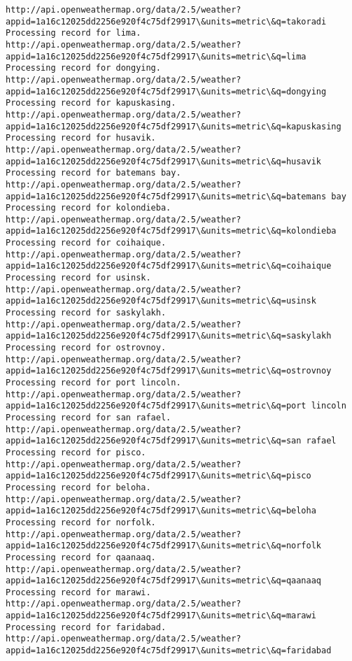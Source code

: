 \documentclass[11pt]{article}
\begin{document}
\begin{Verbatim}[commandchars=\\\{\}]
http://api.openweathermap.org/data/2.5/weather?appid=1a16c12025dd2256e920f4c75df29917\&units=metric\&q=takoradi
Processing record for lima.
http://api.openweathermap.org/data/2.5/weather?appid=1a16c12025dd2256e920f4c75df29917\&units=metric\&q=lima
Processing record for dongying.
http://api.openweathermap.org/data/2.5/weather?appid=1a16c12025dd2256e920f4c75df29917\&units=metric\&q=dongying
Processing record for kapuskasing.
http://api.openweathermap.org/data/2.5/weather?appid=1a16c12025dd2256e920f4c75df29917\&units=metric\&q=kapuskasing
Processing record for husavik.
http://api.openweathermap.org/data/2.5/weather?appid=1a16c12025dd2256e920f4c75df29917\&units=metric\&q=husavik
Processing record for batemans bay.
http://api.openweathermap.org/data/2.5/weather?appid=1a16c12025dd2256e920f4c75df29917\&units=metric\&q=batemans bay
Processing record for kolondieba.
http://api.openweathermap.org/data/2.5/weather?appid=1a16c12025dd2256e920f4c75df29917\&units=metric\&q=kolondieba
Processing record for coihaique.
http://api.openweathermap.org/data/2.5/weather?appid=1a16c12025dd2256e920f4c75df29917\&units=metric\&q=coihaique
Processing record for usinsk.
http://api.openweathermap.org/data/2.5/weather?appid=1a16c12025dd2256e920f4c75df29917\&units=metric\&q=usinsk
Processing record for saskylakh.
http://api.openweathermap.org/data/2.5/weather?appid=1a16c12025dd2256e920f4c75df29917\&units=metric\&q=saskylakh
Processing record for ostrovnoy.
http://api.openweathermap.org/data/2.5/weather?appid=1a16c12025dd2256e920f4c75df29917\&units=metric\&q=ostrovnoy
Processing record for port lincoln.
http://api.openweathermap.org/data/2.5/weather?appid=1a16c12025dd2256e920f4c75df29917\&units=metric\&q=port lincoln
Processing record for san rafael.
http://api.openweathermap.org/data/2.5/weather?appid=1a16c12025dd2256e920f4c75df29917\&units=metric\&q=san rafael
Processing record for pisco.
http://api.openweathermap.org/data/2.5/weather?appid=1a16c12025dd2256e920f4c75df29917\&units=metric\&q=pisco
Processing record for beloha.
http://api.openweathermap.org/data/2.5/weather?appid=1a16c12025dd2256e920f4c75df29917\&units=metric\&q=beloha
Processing record for norfolk.
http://api.openweathermap.org/data/2.5/weather?appid=1a16c12025dd2256e920f4c75df29917\&units=metric\&q=norfolk
Processing record for qaanaaq.
http://api.openweathermap.org/data/2.5/weather?appid=1a16c12025dd2256e920f4c75df29917\&units=metric\&q=qaanaaq
Processing record for marawi.
http://api.openweathermap.org/data/2.5/weather?appid=1a16c12025dd2256e920f4c75df29917\&units=metric\&q=marawi
Processing record for faridabad.
http://api.openweathermap.org/data/2.5/weather?appid=1a16c12025dd2256e920f4c75df29917\&units=metric\&q=faridabad

\end{Verbatim}
\end{document}
